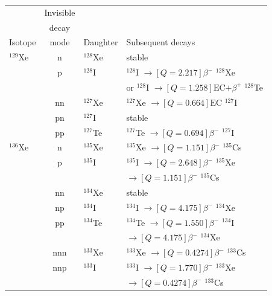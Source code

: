 \begin{table}[!htbp]
\footnotesize\centering
\begin{tabular}{lcll}
        & Invisible &          &  \\
        & decay     &          &  \\
Isotope & mode      & Daughter & Subsequent decays \\
\midrule
$^{129}$Xe & n   & $^{128}$Xe & stable                                                     \\
           & p   & $^{128}$I  & $^{128}$I $\rightarrow[Q = 2.217]{\text{$\beta^{-}$}}$ $^{128}$Xe \\
           &     &            & or $^{128}$I $\rightarrow[Q = 1.258]{\text{EC+$\beta^{+}$}}$ $^{128}$Te     \\
           & nn  & $^{127}$Xe & $^{127}$Xe $\rightarrow[Q = 0.664]{\text{EC}}$ $^{127}$I              \\
           & pn  & $^{127}$I  & stable                                                      \\
           & pp  & $^{127}$Te & $^{127}$Te $\rightarrow[Q = 0.694]{\text{$\beta^{-}$}}$ $^{127}$I      \\
\midrule
$^{136}$Xe & n   & $^{135}$Xe & $^{135}$Xe $\rightarrow[Q = 1.151]{\text{$\beta^{-}$}}$ $^{135}$Cs \\
           & p   & $^{135}$I  & $^{135}$I $\rightarrow[Q = 2.648]{\text{$\beta^{-}$}}$ $^{135}$Xe \\
           &     &            & \phantom{$^{135}$I} $\rightarrow[Q = 1.151]{\text{$\beta^{-}$}}$ $^{135}$Cs  \\
           & nn  & $^{134}$Xe & stable \\
           & np  & $^{134}$I  & $^{134}$I $\rightarrow[Q = 4.175]{\text{$\beta^{-}$}}$ $^{134}$Xe \\
           & pp  & $^{134}$Te & $^{134}$Te $\rightarrow[Q = 1.550]{\text{$\beta^{-}$}}$ $^{134}$I \\
           &     &            & \phantom{$^{134}$Te} $\rightarrow[Q = 4.175]{\text{$\beta^{-}$}}$ $^{134}$Xe  \\
           & nnn & $^{133}$Xe & $^{133}$Xe $\rightarrow[Q = 0.4274]{\text{$\beta^{-}$}}$ $^{133}$Cs \\
           & nnp & $^{133}$I  & $^{133}$I $\rightarrow[Q = 1.770]{\text{$\beta^{-}$}}$ $^{133}$Xe \\
           &     &            & \phantom{$^{133}$I} $\rightarrow[Q = 0.4274]{\text{$\beta^{-}$}}$ $^{133}$Cs \\

\end{tabular}
\end{table}
